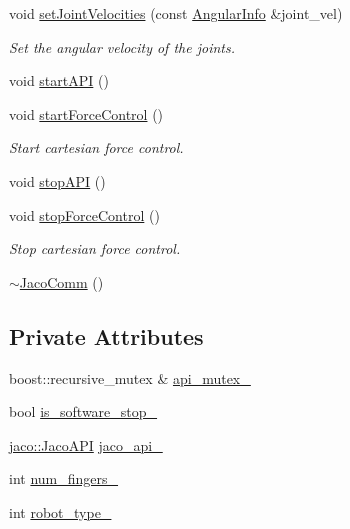 \begin{DoxyCompactItemize}
void \hyperlink{classjaco_1_1JacoComm_af269b1c8d8b1f32c1003ca2e464252f0}{set\+Joint\+Velocities} (const \hyperlink{structAngularInfo}{Angular\+Info} \&joint\+\_\+vel)
\begin{DoxyCompactList}\small\item\em Set the angular velocity of the joints. \end{DoxyCompactList}\item 
void \hyperlink{classjaco_1_1JacoComm_a6b2a1fabc4e6c30da42c9a5e26757398}{start\+A\+PI} ()
\item 
void \hyperlink{classjaco_1_1JacoComm_a00e5493dfbdcaab6c1a9bd388d3b839d}{start\+Force\+Control} ()
\begin{DoxyCompactList}\small\item\em Start cartesian force control. \end{DoxyCompactList}\item 
void \hyperlink{classjaco_1_1JacoComm_a54862830cd6414ae3ae48e46e54bf798}{stop\+A\+PI} ()
\item 
void \hyperlink{classjaco_1_1JacoComm_a339cf31d88fdef6409340c82a35ecb53}{stop\+Force\+Control} ()
\begin{DoxyCompactList}\small\item\em Stop cartesian force control. \end{DoxyCompactList}\item 
\hyperlink{classjaco_1_1JacoComm_a94db89ce398a131d5dd6985a7725f495}{$\sim$\+Jaco\+Comm} ()
\end{DoxyCompactItemize}
\subsection*{Private Attributes}
\begin{DoxyCompactItemize}
\item 
boost\+::recursive\+\_\+mutex \& \hyperlink{classjaco_1_1JacoComm_ac6ef2a6b3c51877fc4237d834c35908a}{api\+\_\+mutex\+\_\+}
\item 
bool \hyperlink{classjaco_1_1JacoComm_a9607500fac99c4dbc5acc98dd513eec3}{is\+\_\+software\+\_\+stop\+\_\+}
\item 
\hyperlink{classjaco_1_1JacoAPI}{jaco\+::\+Jaco\+A\+PI} \hyperlink{classjaco_1_1JacoComm_a8d1510c941f28a4e8f921691d4fd2248}{jaco\+\_\+api\+\_\+}
\item 
int \hyperlink{classjaco_1_1JacoComm_a5812c7504d90ec6016c40cba097ba1bb}{num\+\_\+fingers\+\_\+}
\item 
int \hyperlink{classjaco_1_1JacoComm_afb603f289e6ed8855cbeb0d0b1400829}{robot\+\_\+type\+\_\+}
\end{DoxyCompactItemize}


